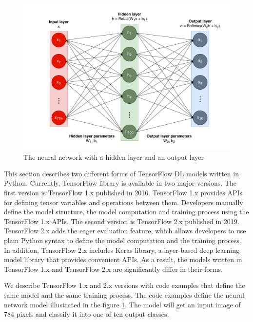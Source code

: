 \begin{figure}[ht!]
\includegraphics[width=\textwidth]{mnist_model.pdf}
  \caption{The neural network with a hidden layer and an output layer}
\label{fig:back:model}
\end{figure}

This section describes two different forms of TensorFlow DL models written in
Python.
Currently, TensorFlow library is available in two major versions.
The first version is TensorFlow 1.x published in 2016.
TensorFlow 1.x provides APIs for defining tensor variables and
operations between them.
Developers manually define the model structure, the model computation
and training process using the TensorFlow 1.x APIs.
The second version is TensorFlow 2.x published in 2019.
TensorFlow 2.x adds the eager evaluation feature,
which allows developers to use plain Python syntax to define the model
computation and the training process.
In addition, TensorFlow 2.x includes Keras library, 
a layer-based deep learning model library that provides convenient APIs.
As a result, the models written in TensorFlow 1.x and TensorFlow 2.x are
significantly differ in their forms. 

We describe TensorFlow 1.x and 2.x versions with code examples that define
the same model and the same training process.
The code examples define the neural network model illustrated
in the figure \ref{fig:back:model}.
The model will get an input image of 784 pixels and classify it into one of ten
output classes.
 
